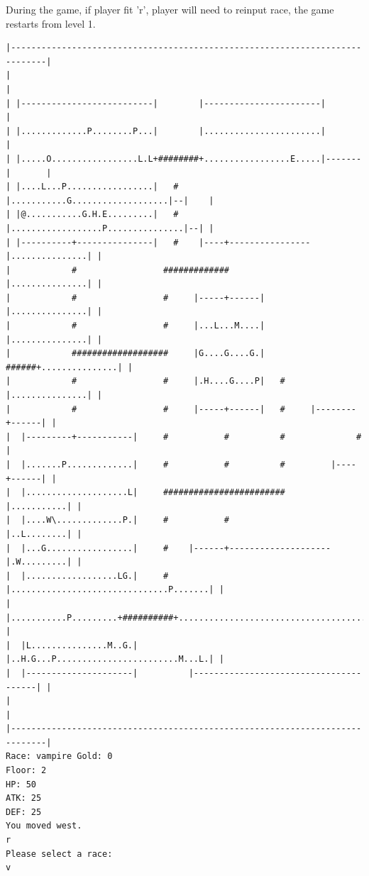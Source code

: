 \documentclass[11pt]{article}
\theoremstyle{plain}
\begin{document}
During the game, if player fit 'r', player will need to reinput race, 
the game restarts from level 1.
\begin{Verbatim}[fontsize=\scriptsize]
|-----------------------------------------------------------------------------|
|                                                                             |
| |--------------------------|        |-----------------------|               |
| |.............P........P...|        |.......................|               |
| |.....O.................L.L+########+.................E.....|-------|       |
| |....L...P.................|   #    |...........G...................|--|    |
| |@...........G.H.E.........|   #    |..................P...............|--| |
| |----------+---------------|   #    |----+----------------|...............| |
|            #                 #############                |...............| |
|            #                 #     |-----+------|         |...............| |
|            #                 #     |...L...M....|         |...............| |
|            ###################     |G....G....G.|   ######+...............| |
|            #                 #     |.H....G....P|   #     |...............| |
|            #                 #     |-----+------|   #     |--------+------| |
|  |---------+-----------|     #           #          #              #        |
|  |.......P.............|     #           #          #         |----+------| |
|  |....................L|     ########################         |...........| |
|  |....W\.............P.|     #           #                    |..L........| |
|  |...G.................|     #    |------+--------------------|.W.........| |
|  |..................LG.|     #    |...............................P.......| |
|  |...........P.........+##########+.......................................| |
|  |L...............M..G.|          |..H.G...P........................M...L.| |
|  |---------------------|          |---------------------------------------| |
|                                                                             |
|-----------------------------------------------------------------------------|
Race: vampire Gold: 0                                                  Floor: 2
HP: 50
ATK: 25
DEF: 25
You moved west. 
r
Please select a race:
v


\end{Verbatim}
\end{document}
